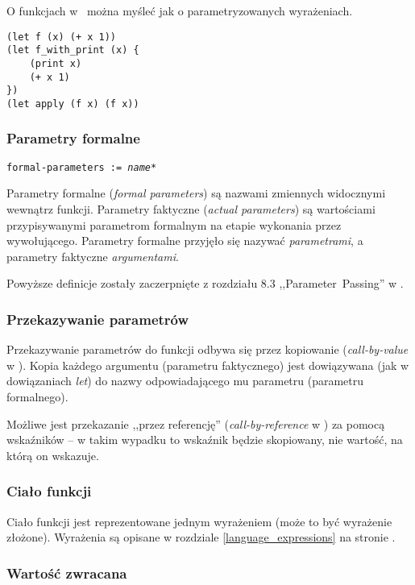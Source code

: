 O funkcjach w \ViuAct\ można myśleć jak o parametryzowanych wyrażeniach.

\begin{lstlisting}
(let f (x) (+ x 1))
(let f_with_print (x) {
    (print x)
    (+ x 1)
})
(let apply (f x) (f x))
\end{lstlisting}

\subsubsection{Parametry formalne}

\texttt{formal-parameters := \emph{name}*}
\vspace{1em}

Parametry formalne (\emph{formal parameters}) są nazwami zmiennych widocznymi
wewnątrz funkcji. Parametry faktyczne (\emph{actual parameters}) są wartościami
przypisywanymi parametrom formalnym na etapie wykonania przez wywołującego.
Parametry formalne przyjęło się nazywać \emph{parametrami}, a parametry
faktyczne \emph{argumentami}.

Powyższe definicje zostały zaczerpnięte z rozdziału 8.3 ,,Parameter~Passing'' w
\cite{ProgrammingLanguagePragmatics}.

\subsubsection{Przekazywanie parametrów}

Przekazywanie parametrów do funkcji odbywa się przez kopiowanie
(\emph{call-by-value} w \cite{ProgrammingLanguagePragmatics}). Kopia każdego
argumentu (parametru faktycznego) jest dowiązywana (jak w dowiązaniach
\emph{let}) do nazwy odpowiadającego mu parametru (parametru formalnego).

Możliwe jest przekazanie ,,przez referencję'' (\emph{call-by-reference} w
\cite{ProgrammingLanguagePragmatics}) za pomocą wskaźników -- w takim wypadku to
wskaźnik będzie skopiowany, nie wartość, na którą on wskazuje.

\subsubsection{Ciało funkcji}

Ciało funkcji jest reprezentowane jednym wyrażeniem (może to być wyrażenie
złożone). Wyrażenia są opisane w rozdziale \ref{language_expressions} na stronie
\pageref{language_expressions}.

\subsubsection{Wartość zwracana}

